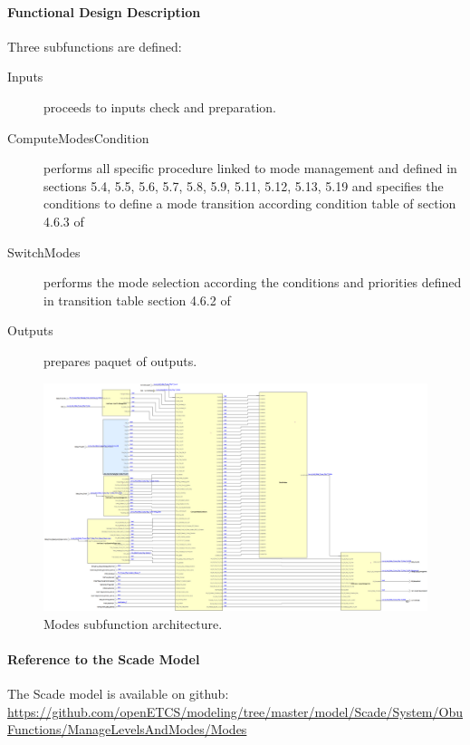 \paragraph{Functional Design Description}

Three subfunctions are defined:
\begin{description}
\item[Inputs] proceeds to inputs check and preparation.
\item[ComputeModesCondition] performs all specific procedure linked to mode management and defined in  \citep{subset-026} sections 5.4, 5.5, 5.6, 5.7, 5.8, 5.9, 5.11, 5.12, 5.13, 5.19 and specifies the conditions to define a mode transition according condition table of section 4.6.3 of \citep{subset-026}
\item[SwitchModes] performs the mode selection according the conditions and priorities defined in transition table  section 4.6.2 of \citep{subset-026}
\item[Outputs] prepares paquet of outputs.
\end{description}


\begin{landscape}
\begin{figure}
\centering
\includegraphics[scale=0.3]{images/ManageModes.png}
\caption{Modes subfunction architecture.}
\end{figure}
\end{landscape}

\paragraph{Reference to the Scade Model}
The Scade model is available on github:
\url{https://github.com/openETCS/modeling/tree/master/model/Scade/System/ObuFunctions/ManageLevelsAndModes/Modes}

